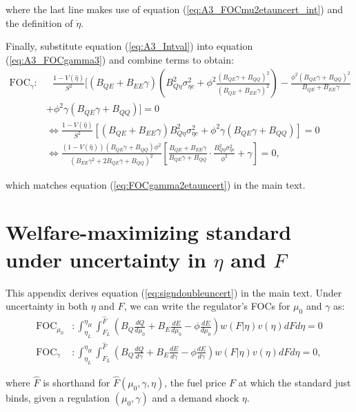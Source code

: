 \documentclass[12pt]{article}
\begin{document}
where the last line makes use of equation (\ref{eq:A3_FOCmu2etauncert_int}) and the definition of $\dot{\eta}$.

Finally, substitute equation (\ref{eq:A3_Intval}) into equation (\ref{eq:A3_FOCgamma3}) and combine terms to obtain:
\begin{align}
\text{FOC}_{\gamma}:& \text{ } \frac{1-V(\hat{\eta})}{S^2}[(B_{QE}+B_{EE}\gamma)\left(B_{Q\eta}^2\sigma_{\eta c}^2 + \phi^2\frac{(B_{QE}\gamma+B_{QQ})^2}{(B_{QE}+B_{EE}\gamma)^2}\right) - \frac{\phi^2(B_{QE}\gamma+B_{QQ})^2}{B_{QE}+B_{EE}\gamma} \nonumber \\
& + \phi^2\gamma(B_{QE}\gamma+B_{QQ})] = 0 \\
&\Leftrightarrow \frac{1-V(\hat{\eta})}{S^2}[(B_{QE}+B_{EE}\gamma)B_{Q\eta}^2\sigma_{\eta c}^2 + \phi^2\gamma(B_{QE}\gamma+B_{QQ})] = 0 \\
&\Leftrightarrow \frac{(1-V(\hat{\eta}))(B_{QE}\gamma+B_{QQ})\phi^2} {(B_{EE}\gamma^2+2B_{QE}\gamma+B_{QQ})^2}\left[\frac{B_{QE}+B_{EE}\gamma}{B_{QE}\gamma+B_{QQ}}\cdot \frac{B_{Q\eta}^2\sigma_{\eta c}^2}{\phi^2}+\gamma\right]=0, \label{eq:A3_final}
\end{align}

which matches equation (\ref{eq:FOCgamma2etauncert}) in the main text.


\section{Welfare-maximizing standard under uncertainty in $\eta$ and $F$} \label{appx:doubleuncert}

This appendix derives equation (\ref{eq:signdoubleuncert}) in the main text. Under uncertainty in both $\eta$ and $F$, we can write the regulator's FOCs for $\mu_0$ and $\gamma$ as:
\begin{align}
\text{FOC}_{\mu_0}&:\int_{\eta_L}^{\eta_H}\int_{F_L}^{\hat{F}}\left(B_Q\frac{dQ}{d\mu_0} +B_E\frac{dE}{d\mu_0} -\phi\frac{dE}{d\mu_0}\right)w(F|\eta)v(\eta)dFd\eta = 0 \label{eq:A4_FOCmu0} \\
\text{FOC}_{\gamma}&:\int_{\eta_L}^{\eta_H}\int_{F_L}^{\hat{F}}\left(B_Q\frac{dQ}{d\gamma} +B_E\frac{dE}{d\gamma} -\phi\frac{dE}{d\gamma}\right)w(F|\eta)v(\eta)dFd\eta = 0, \label{eq:A4_FOCgamma}
\end{align}

where $\hat{F}$ is shorthand for $\hat{F}(\mu_0,\gamma,\eta)$, the fuel price $F$ at which the standard just binds, given a regulation $(\mu_0,\gamma)$ and a demand shock $\eta$. 
\end{document}

